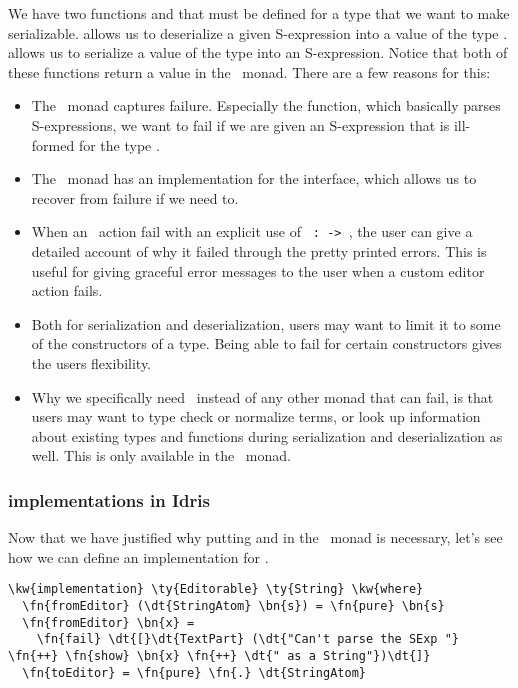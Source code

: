 We have two functions  and  that must be defined
for a type that we want to make serializable.
 allows us to deserialize a given S-expression into a value of the type .
 allows us to serialize a value of the type  into an S-expression.
Notice that both of these functions return a value in the \Elab\ monad.
There are a few reasons for this:
\begin{itemize}
  \item The \Elab\ monad captures failure. Especially the 
    function, which basically parses S-expressions, we want to fail if we are
    given an S-expression that is ill-formed for the type .
  \item The \Elab\ monad has an implementation for the 
    interface, which allows us to recover from failure if we need to.
  \item When an \Elab\ action fail with an explicit use of
    \texttt{ :  ->  },
    the user can give a detailed account of why it failed through the pretty
    printed errors. This is useful for giving graceful error messages to the
    user when a custom editor action fails.
  \item Both for serialization and deserialization, users may want to limit it
    to some of the constructors of a type. Being able to fail for certain
    constructors gives the users flexibility.
  \item Why we specifically need \Elab\ instead of any other monad that can
    fail, is that users may want to type check or normalize terms, or look up
    information about existing types and functions during serialization and
    deserialization as well. This is only available in the \Elab\ monad.
\end{itemize}

\subsubsection{ implementations in Idris}

Now that we have justified why putting  and 
in the \Elab\ monad is necessary,
let's see how we can define an  implementation for .

\begin{Verbatim}[framesep=2mm, label=\footnotesize{\normalfont{Idris}}, labelposition=topline]
\kw{implementation} \ty{Editorable} \ty{String} \kw{where}
  \fn{fromEditor} (\dt{StringAtom} \bn{s}) = \fn{pure} \bn{s}
  \fn{fromEditor} \bn{x} =
    \fn{fail} \dt{[}\dt{TextPart} (\dt{"Can't parse the SExp "} \fn{++} \fn{show} \bn{x} \fn{++} \dt{" as a String"})\dt{]}
  \fn{toEditor} = \fn{pure} \fn{.} \dt{StringAtom}
\end{Verbatim}

